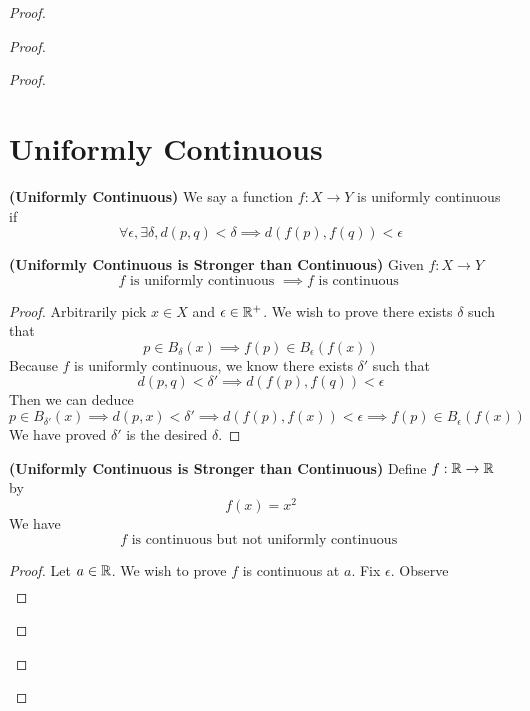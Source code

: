\documentclass{report}
\begin{document}
\begin{proof}
\begin{proof}
\begin{proof}
\section{Uniformly Continuous}
\begin{definition}
\label{5.2.1}
\textbf{(Uniformly Continuous)} We say a function $f:X\rightarrow Y$ is uniformly continuous if 
\begin{equation*}
\forall \epsilon, \exists \delta, d(p,q)<\delta \implies d(f(p),f(q))<\epsilon 
\end{equation*}
\end{definition}
\begin{theorem}
\label{5.2.2}
\textbf{(Uniformly Continuous is Stronger than Continuous)} Given $f:X\rightarrow Y$
\begin{equation*}
f\text{ is uniformly continuous }\implies f\text{ is continuous }
\end{equation*}
\end{theorem}
\begin{proof}
Arbitrarily pick $x\in X$ and $\epsilon \in\mathbb{R}^+$. We wish to prove there exists $\delta$ such that 
\begin{equation*}
p \in B_{\delta}(x)\implies f(p)\in B_{\epsilon }(f(x))
\end{equation*}
Because $f$ is uniformly continuous, we know there exists $\delta'$ such that 
\begin{equation*}
d(p,q)<\delta'\implies d(f(p),f(q))<\epsilon 
\end{equation*}
Then we can deduce 
\begin{equation*}
p\in B_{\delta'}(x)\implies d(p,x)<\delta ' \implies d(f(p),f(x))<\epsilon  \implies f(p)\in B_{\epsilon }(f(x))
\end{equation*}
We have proved $\delta'$ is the desired $\delta$. 
\end{proof}
\begin{theorem}
\label{5.2.3}
\textbf{(Uniformly Continuous is Stronger than Continuous)} Define $f:\mathbb{R}\rightarrow \mathbb{R}$ by
\begin{equation*}
f(x)=x^2
\end{equation*}
We have 
\begin{equation*}
f\text{ is continuous but not uniformly continuous }
\end{equation*}
\end{theorem}
\begin{proof}
Let $a\in\mathbb{R}$. We wish to prove $f$ is continuous at  $a$. Fix  $\epsilon $. Observe 
\begin{align*}

\end{align*}
\end{proof}
\end{proof}
\end{proof}
\end{proof}
\end{document}
